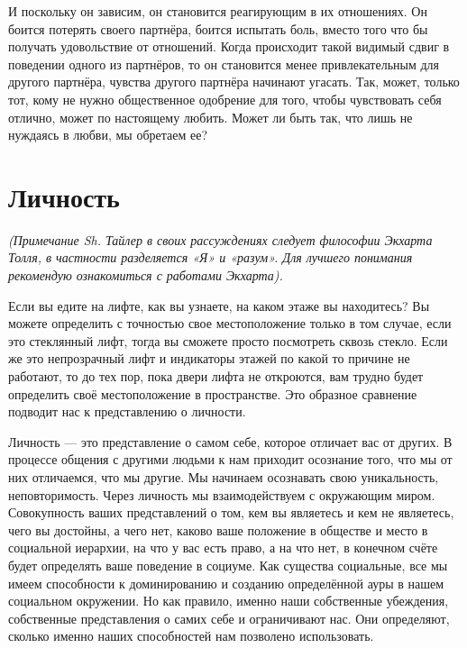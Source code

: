 И поскольку он зависим, он становится реагирующим в их отношениях. Он боится потерять своего партнёра, боится испытать боль, вместо того что бы получать удовольствие от отношений. Когда происходит такой видимый сдвиг в поведении одного из партнёров, то он становится менее привлекательным для другого партнёра, чувства другого партнёра начинают угасать. Так, может, только тот, кому не нужно общественное одобрение для того, чтобы чувствовать себя отлично, может по настоящему любить. Может ли быть так, что лишь не нуждаясь в любви, мы обретаем ее?
\chapter{Личность}

\textit{(Примечание Sh. Тайлер в своих рассуждениях следует философии Экхарта Толля, в частности разделяется «Я» и «разум». Для лучшего понимания рекомендую ознакомиться с работами Экхарта).}

Если вы едите на лифте, как вы узнаете, на каком этаже вы находитесь? Вы можете определить с точностью свое местоположение только в том случае, если это стеклянный лифт, тогда вы сможете просто посмотреть сквозь стекло. Если же это непрозрачный лифт и индикаторы этажей по какой то причине не работают, то до тех пор, пока двери лифта не откроются, вам трудно будет определить своё местоположение в пространстве. Это образное сравнение подводит нас к представлению о личности.

Личность --- это представление о самом себе, которое отличает вас от других. В процессе общения с другими людьми к нам приходит осознание того, что мы от них отличаемся, что мы другие. Мы начинаем осознавать свою уникальность, неповторимость. Через личность мы взаимодействуем с окружающим миром. Совокупность ваших представлений о том, кем вы являетесь и кем не являетесь, чего вы достойны, а чего нет, каково ваше положение в обществе и место в социальной иерархии, на что у вас есть право, а на что нет, в конечном счёте будет определять ваше поведение в социуме. Как существа социальные, все мы имеем способности к доминированию и созданию определённой ауры в нашем социальном окружении. Но как правило, именно наши собственные убеждения, собственные представления о самих себе и ограничивают нас. Они определяют, сколько именно наших способностей нам позволено использовать.

